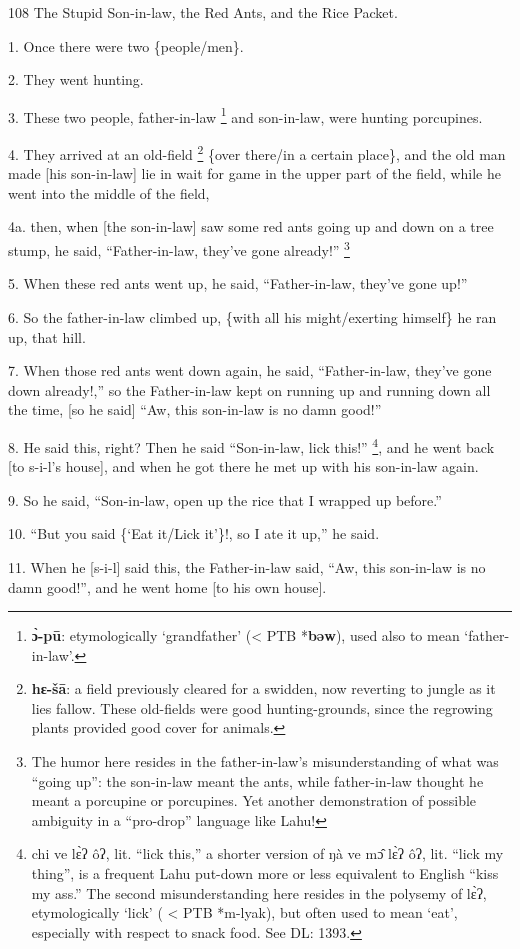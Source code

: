 
108 The Stupid Son-in-law, the Red Ants, and the Rice Packet.

1. Once there were two \{people/men\}.

2. They went hunting.

3. These two people, father-in-law \footnote{\textbf{ɔ̀-pū}: etymologically `grandfather' (< PTB *\textbf{bəw}), used also to mean `father-in-law'.} and son-in-law, were hunting porcupines.

4. They arrived at an old-field \footnote{\textbf{hɛ-šā}: a field previously cleared for a swidden, now reverting to jungle as it lies fallow. These old-fields were good hunting-grounds, since the regrowing plants provided good cover for animals.} \{over there/in a certain place\}, and the
old man made [his son-in-law] lie in wait for game in the upper part of the field,
while he went into the middle of the field,

4a. then, when [the son-in-law] saw some red ants going up and down on a tree stump,
he said, ``Father-in-law, they've gone already!'' \footnote{The humor here resides in the father-in-law's misunderstanding of what was ``going up'': the son-in-law meant the ants, while father-in-law thought he meant a porcupine or porcupines. Yet another demonstration of possible ambiguity in a ``pro-drop'' language like Lahu!}

5. When these red ants went up, he said, ``Father-in-law, they've gone up!''

6. So the father-in-law climbed up, \{with all his might/exerting himself\} he
ran up, that hill.

7. When those red ants went down again, he said, ``Father-in-law, they've gone
down already!,'' so the Father-in-law kept on running up and running down all the
time, [so he said] ``Aw, this son-in-law is no damn good!''

8. He said this, right? Then he said ``Son-in-law, lick this!'' \footnote{chi ve lɛ̀ʔ ôʔ, lit. ``lick this,'' a shorter version of ŋà ve mɔ̂ lɛ̀ʔ ôʔ, lit. ``lick my thing'', is a frequent Lahu put-down more or less equivalent to English ``kiss my ass.'' The second misunderstanding here resides in the polysemy of lɛ̀ʔ, etymologically `lick' ( < PTB *m-lyak), but often used to mean `eat', especially with respect to snack food. See DL: 1393.}, and he went
back [to s-i-l's house], and when he got there he met up with his son-in-law again.

9. So he said, ``Son-in-law, open up the rice that I wrapped up before.''

10. ``But you said \{`Eat it/Lick it'\}!, so I ate it up,'' he said.

11. When he [s-i-l] said this, the Father-in-law said, ``Aw, this son-in-law is
no damn good!'', and he went home [to his own house].

